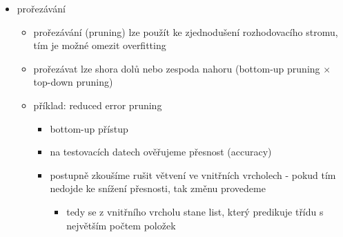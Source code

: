 \begin{itemize}
\begin{itemize}
\item tím, že minimalizujeme dělicí kritérium, minimalizujeme minimální dosažitelnou hodnotu ztrátové funkce pro daný strom
\end{itemize}
\item prořezávání
\begin{itemize}
\item prořezávání (pruning) lze použít ke zjednodušení rozhodovacího stromu, tím je možné omezit overfitting
\item prořezávat lze shora dolů nebo zespoda nahoru (bottom-up pruning $\times$ top-down pruning)
\item příklad: reduced error pruning
\begin{itemize}
\item bottom-up přístup
\item na testovacích datech ověřujeme přesnost (accuracy)
\item postupně zkoušíme rušit větvení ve vnitřních vrcholech - pokud tím nedojde ke snížení přesnosti, tak změnu provedeme
\begin{itemize}
\item tedy se z vnitřního vrcholu stane list, který predikuje třídu s největším počtem položek
\end{itemize}
\end{itemize}
\end{itemize}
\end{itemize}
